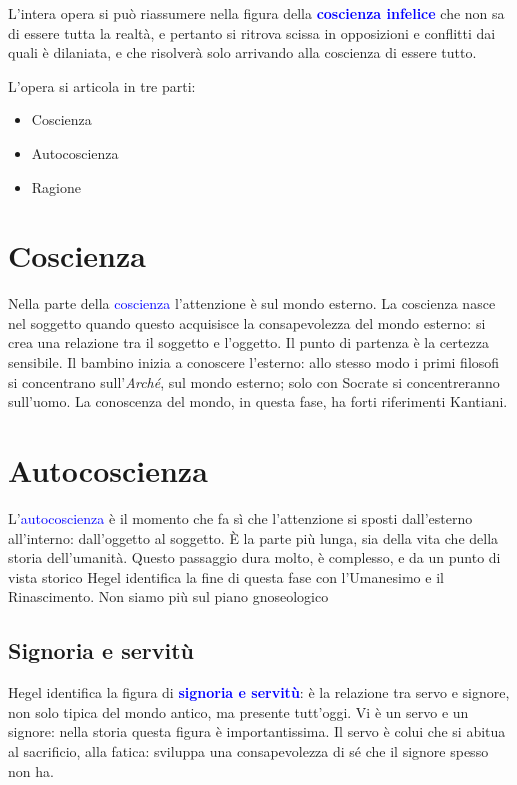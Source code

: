 \documentclass[a4paper, twoside, titlepage]{book}
\renewcommand{\emph}[1]{\textcolor{blue}{#1}}
\begin{document}
L'intera opera si può riassumere nella figura della \emph{\textbf{coscienza infelice}} che non sa di essere tutta la realtà, e pertanto si ritrova scissa in opposizioni e conflitti dai quali è dilaniata, e che risolverà solo arrivando alla coscienza di essere tutto.

L’opera si articola in tre parti:
\begin{itemize}
\item Coscienza
\item Autocoscienza
\item Ragione
\end{itemize}

\section{Coscienza}

Nella parte della \emph{coscienza} l’attenzione è sul mondo esterno. La coscienza nasce nel soggetto quando questo acquisisce la consapevolezza del mondo esterno: si crea una relazione tra il soggetto e l’oggetto.
Il punto di partenza è la certezza sensibile.
Il bambino inizia a conoscere l’esterno: allo stesso modo i primi filosofi si concentrano sull’\textit{Arché}, sul mondo esterno; solo con Socrate si concentreranno sull’uomo.
La conoscenza del mondo, in questa fase, ha forti riferimenti Kantiani.

\section{Autocoscienza}

L’\emph{autocoscienza} è il momento che fa sì che l’attenzione si sposti dall’esterno all’interno: dall’oggetto al soggetto. È la parte più lunga, sia della vita che della storia dell’umanità.
Questo passaggio dura molto, è complesso, e da un punto di vista storico Hegel identifica la fine di questa fase con l’Umanesimo e il Rinascimento.
Non siamo più sul piano gnoseologico

\subsection{Signoria e servitù}

Hegel identifica la figura di \emph{\textbf{signoria e servitù}}: è la relazione tra servo e signore, non solo tipica del mondo antico, ma presente tutt’oggi.
Vi è un servo e un signore: nella storia questa figura è importantissima.
Il servo è colui che si abitua al sacrificio, alla fatica: sviluppa una consapevolezza di sé che il signore spesso non ha.
\end{document}
